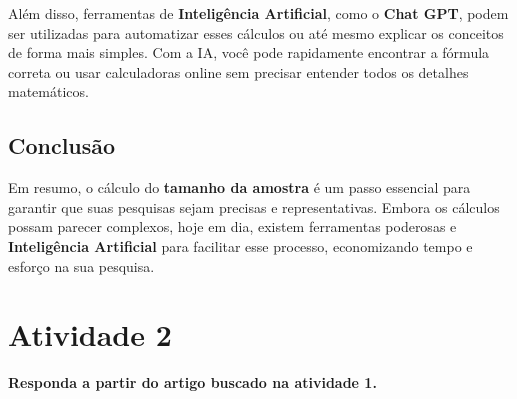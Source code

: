 \documentclass[
]{book}
\begin{document}
Além disso, ferramentas de \textbf{Inteligência Artificial}, como o \textbf{Chat GPT}, podem ser utilizadas para automatizar esses cálculos ou até mesmo explicar os conceitos de forma mais simples. Com a IA, você pode rapidamente encontrar a fórmula correta ou usar calculadoras online sem precisar entender todos os detalhes matemáticos.

\subsection{Conclusão}\label{conclusuxe3o}

Em resumo, o cálculo do \textbf{tamanho da amostra} é um passo essencial para garantir que suas pesquisas sejam precisas e representativas. Embora os cálculos possam parecer complexos, hoje em dia, existem ferramentas poderosas e \textbf{Inteligência Artificial} para facilitar esse processo, economizando tempo e esforço na sua pesquisa.

\section{Atividade 2}\label{atividade-2}

\textbf{Responda a partir do artigo buscado na atividade 1.}
\end{document}
